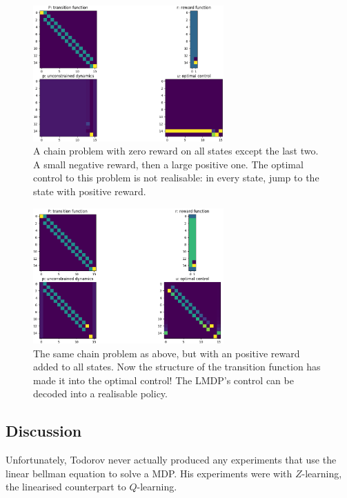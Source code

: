 \begin{figure}
\centering
\includegraphics[width=0.65\textwidth,height=0.325\textheight]{../../pictures/figures/chain-test-zero-rewards.png}
\caption{A chain problem \cite{Sutton2018a} with zero reward on all states except the last two. A small negative reward, then a large positive one.
The optimal control to this problem is not realisable: in every state, jump to the state with positive reward.}
\label{fig:chain-zero}
\end{figure}

\begin{figure}
\centering
\includegraphics[width=0.65\textwidth,height=0.325\textheight]{../../pictures/figures/chain-test-pos-rewards.png}
\caption{The same chain problem as above, but with an positive reward added to all states.
Now the structure of the transition function has made it into the optimal control!
The LMDP's control can be decoded into a realisable policy.}
\label{fig:chain-pos}
\end{figure}

\subsection{Discussion}\label{lmdp-validation}

Unfortunately, Todorov \cite{Todorov2006,Todorov2009} never actually produced
any experiments that use the linear bellman equation to solve a MDP.
His experiments were with $Z$-learning, the linearised counterpart to $Q$-learning.

